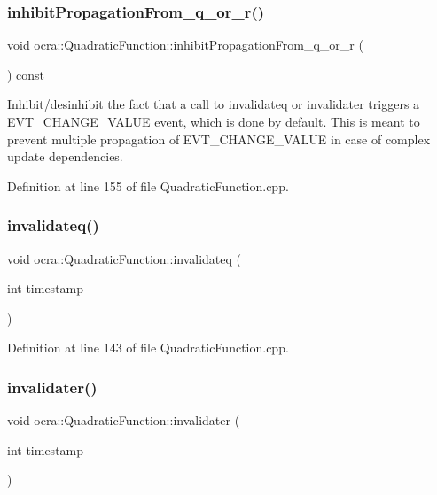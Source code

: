 \subsubsection{\texorpdfstring{inhibit\+Propagation\+From\+\_\+q\+\_\+or\+\_\+r()}{inhibitPropagationFrom\_q\_or\_r()}}
{\footnotesize\ttfamily void ocra\+::\+Quadratic\+Function\+::inhibit\+Propagation\+From\+\_\+q\+\_\+or\+\_\+r (\begin{DoxyParamCaption}{ }\end{DoxyParamCaption}) const\hspace{0.3cm}{\ttfamily [protected]}}

Inhibit/desinhibit the fact that a call to invalidateq or invalidater triggers a E\+V\+T\+\_\+\+C\+H\+A\+N\+G\+E\+\_\+\+V\+A\+L\+UE event, which is done by default. This is meant to prevent multiple propagation of E\+V\+T\+\_\+\+C\+H\+A\+N\+G\+E\+\_\+\+V\+A\+L\+UE in case of complex update dependencies. 

Definition at line 155 of file Quadratic\+Function.\+cpp.

\hypertarget{classocra_1_1QuadraticFunction_ab98c6562b88ef393f03ea0d1c9863f0e}{}\label{classocra_1_1QuadraticFunction_ab98c6562b88ef393f03ea0d1c9863f0e} 
\subsubsection{\texorpdfstring{invalidateq()}{invalidateq()}}
{\footnotesize\ttfamily void ocra\+::\+Quadratic\+Function\+::invalidateq (\begin{DoxyParamCaption}\item[{int}]{timestamp }\end{DoxyParamCaption})\hspace{0.3cm}{\ttfamily [protected]}}



Definition at line 143 of file Quadratic\+Function.\+cpp.

\hypertarget{classocra_1_1QuadraticFunction_a3d76d4ae8dc9ffbefcdf7027e72665c4}{}\label{classocra_1_1QuadraticFunction_a3d76d4ae8dc9ffbefcdf7027e72665c4} 
\subsubsection{\texorpdfstring{invalidater()}{invalidater()}}
{\footnotesize\ttfamily void ocra\+::\+Quadratic\+Function\+::invalidater (\begin{DoxyParamCaption}\item[{int}]{timestamp }\end{DoxyParamCaption})\hspace{0.3cm}{\ttfamily [protected]}}



